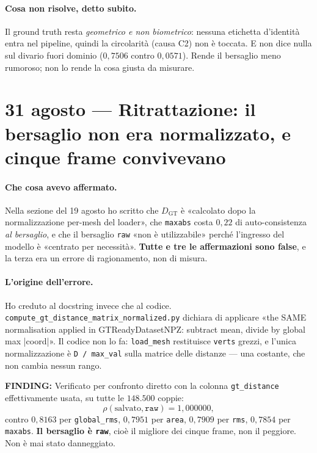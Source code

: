 \documentclass[11pt,a4paper]{article}
\newcommand{\finding}[1]{\textcolor{finding}{\textbf{FINDING:}} #1}
\begin{document}
\paragraph{Cosa non risolve, detto subito.} Il ground truth resta \emph{geometrico e non
biometrico}: nessuna etichetta d'identit\`a entra nel pipeline, quindi la circolarit\`a (causa
C2) non \`e toccata. E non dice nulla sul divario fuori dominio ($0{,}7506$ contro $0{,}0571$).
Rende il bersaglio meno rumoroso; non lo rende la cosa giusta da misurare.


\section{31 agosto --- Ritrattazione: il bersaglio non era normalizzato, e cinque frame convivevano}

\paragraph{Che cosa avevo affermato.} Nella sezione del 19 agosto ho scritto che $D_{\mathrm{GT}}$
\`e «calcolato dopo la normalizzazione per-mesh del loader», che \texttt{maxabs} costa
$0{,}22$ di auto-consistenza \emph{al bersaglio}, e che il bersaglio \texttt{raw} «non \`e
utilizzabile» perch\'e l'ingresso del modello \`e «centrato per necessit\`a». \textbf{Tutte e tre
le affermazioni sono false}, e la terza era un errore di ragionamento, non di misura.

\paragraph{L'origine dell'errore.} Ho creduto al docstring invece che al codice.
\texttt{compute\_gt\_distance\_matrix\_normalized.py} dichiara di applicare «the SAME
normalisation applied in GTReadyDatasetNPZ: subtract mean, divide by global max |coord|».
Il codice non lo fa: \texttt{load\_mesh} restituisce \texttt{verts} grezzi, e l'unica
normalizzazione \`e \texttt{D / max\_val} sulla matrice delle distanze --- una costante, che non
cambia nessun rango.

\finding{Verificato per confronto diretto con la colonna \texttt{gt\_distance} effettivamente
usata, su tutte le $148{.}500$ coppie:
\[
\rho(\text{salvato}, \texttt{raw}) = 1{,}000000,
\]
contro $0{,}8163$ per \texttt{global\_rms}, $0{,}7951$ per \texttt{area}, $0{,}7909$ per
\texttt{rms}, $0{,}7854$ per \texttt{maxabs}. \textbf{Il bersaglio \`e \texttt{raw}}, cio\`e il
migliore dei cinque frame, non il peggiore. Non \`e mai stato danneggiato.}
\end{document}
